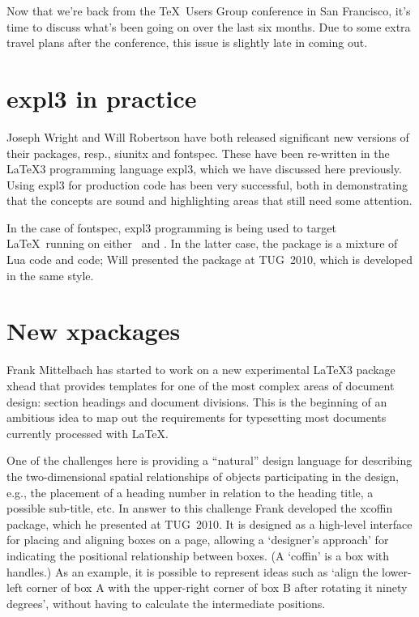 \documentclass{ltnews}
\begin{document}
\maketitle

\noindent
Now that we're back from the \TeX\ Users Group conference in San
Francisco, it's time to discuss what's been going on over the last six months.
Due to some extra travel plans after the conference, this issue is slightly
late in coming out.


\section{\textsf{expl3} in practice}

Joseph Wright and Will Robertson have both released significant new versions
of their packages, resp., \textsf{siunitx} and \textsf{fontspec}. These have
been re-written in the \LaTeX3 programming language \textsf{expl3}, which we
have discussed here previously. Using \textsf{expl3} for production code has
been very successful, both in demonstrating that the concepts are sound and
highlighting areas that still need some attention.

In the case of \textsf{fontspec}, \textsf{expl3} programming is being used to
target \LaTeX\ running on either \XeTeX\ and . In the latter
case, the package is a mixture of Lua code and  code; Will
presented the  package at TUG~2010, which is developed in
the same style.


\section{New \textsf{xpackages}}

Frank Mittelbach has started to work on a new experimental \LaTeX3 package
\textsf{xhead} that provides templates for one of the most complex areas of
document design: section headings and document divisions. This
is the beginning of an ambitious idea to map out the requirements for
typesetting most documents currently processed with \LaTeX.

One of the challenges here is providing a ``natural'' design language for
describing the two-dimensional spatial relationships of objects participating
in the design, e.g., the placement of a heading number in relation to the
heading title, a possible sub-title, etc. In answer to this challenge Frank
developed the \textsf{xcoffin} package, which he presented at TUG~2010. It is
designed as a high-level interface for placing and aligning boxes on a page,
allowing a `designer's approach' for indicating the positional relationship
between boxes. (A `coffin' is a box with handles.) As an example, it is
possible to represent ideas such as `align the lower-left corner of box A with
the upper-right corner of box B after rotating it ninety degrees', without
having to calculate the intermediate positions.
\end{document}
